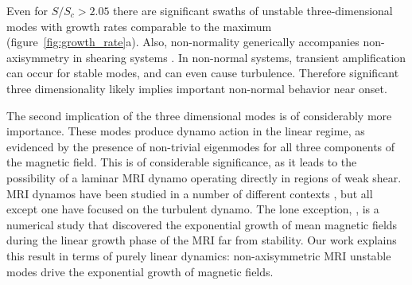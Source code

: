 \documentclass[aps,prl,reprint,superscriptaddress]{revtex4-1}
\newcommand{\SSC}{S/S_{c}}
\begin{document}
Even for $\SSC> 2.05$ there are significant swaths of unstable three-dimensional modes with growth rates comparable to the maximum (figure~\ref{fig:growth_rate}a).
Also, non-normality generically accompanies non-axisymmetry in shearing systems \citep[see][for a discussion relevant to the MRI]{1992MNRAS.255P..25K}.
In non-normal systems, transient amplification can occur for stable modes, and can even cause turbulence.
Therefore significant three dimensionality likely implies important non-normal behavior near onset.

The second implication of the three dimensional modes is of considerably more importance.
These modes produce dynamo action in the linear regime, as evidenced by the presence of non-trivial eigenmodes for all three components of the magnetic field.
This is of considerable significance, as it leads to the possibility of a laminar MRI dynamo operating directly in regions of weak shear.
MRI dynamos have been studied in a number of different contexts \citep{2007PhRvL..98y4502R,2011ApJ...740...18O,2015PhRvL.114h5002S}, but all except one have focused on the turbulent dynamo. The lone exception, \citet{2016MNRAS.462..818B}, is a numerical study that discovered the exponential growth of mean magnetic fields during the linear growth phase of the MRI far from stability.
Our work explains this result in terms of purely linear dynamics:
non-axisymmetric MRI unstable modes drive the exponential growth of magnetic fields.
\end{document}
